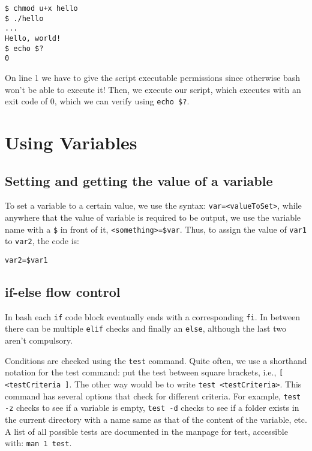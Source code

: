 \vspace{-15pt}
\begin{verbatim}
$ chmod u+x hello 
$ ./hello 
...
Hello, world!
$ echo $?
0
\end{verbatim}
\vspace{-10pt}	

\noindent
On line 1 we have to give the script executable permissions since otherwise bash won't be able to execute it! Then, we execute our script, which executes with an exit code of 0, which we can verify using \verb|echo $?|.

\section{Using Variables}
\subsection{Setting and getting the value of a variable}
To set a variable to a certain value, we use the syntax: \verb|var=<valueToSet>|, while anywhere that the value of variable is required to be output, we use the variable name with a \verb|$| in front of it, \verb|<something>=$var|. Thus, to assign the value of \verb|var1| to \verb|var2|, the code is:

\vspace{-15pt}
\begin{verbatim}
var2=$var1
\end{verbatim}
\vspace{-10pt}	

\subsection{if-else flow control}
In bash each \verb|if| code block eventually ends with a corresponding \verb|fi|. In between there can be multiple \verb|elif| checks and finally an \verb|else|, although the last two aren't compulsory. 

Conditions are checked using the \verb|test| command. Quite often, we use a shorthand notation for the test command: put the test between square brackets, i.e., \verb|[ <testCriteria ]|. The other way would be to write \verb|test <testCriteria>|. This command has several options that check for different criteria. For example, \verb|test -z| checks to see if a variable is empty, \verb|test -d| checks to see if a folder exists in the current directory with a name same as that of the content of the variable, etc. A list of all possible tests are documented in the manpage for test, accessible with: \verb|man 1 test|. 

